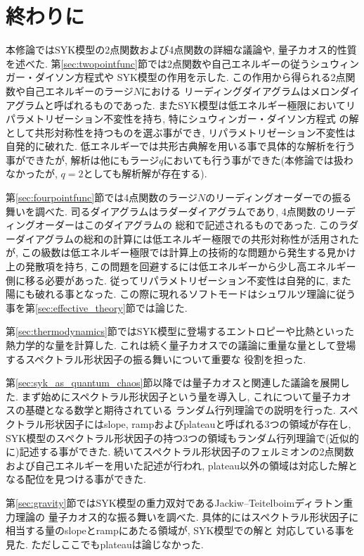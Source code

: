 \section{終わりに\label{sec:conclusion}}
本修論ではSYK模型の2点関数および4点関数の詳細な議論や, 量子カオス的性質を述べた. 
第\ref{sec:twopointfunc}節では2点関数や自己エネルギーの従うシュウィンガー・ダイソン方程式や
SYK模型の作用を示した. 
この作用から得られる2点関数や自己エネルギーのラージ$N$における
リーディングダイアグラムはメロンダイアグラムと呼ばれるものであった. 
またSYK模型は低エネルギー極限においてリパラメトリゼーション不変性を持ち, 特にシュウィンガー・ダイソン方程式
の解として共形対称性を持つものを選ぶ事ができ, リパラメトリゼーション不変性は自発的に破れた. 
低エネルギーでは共形古典解を用いる事で具体的な解析を行う事ができたが, 
解析は他にもラージ$q$においても行う事ができた(本修論では扱わなかったが, $q=2$としても解析解が存在する). 

第\ref{sec:fourpointfunc}節では4点関数のラージ$N$のリーディングオーダーでの振る舞いを調べた. 
司るダイアグラムはラダーダイアグラムであり, 4点関数のリーディングオーダーはこのダイアグラムの
総和で記述されるものであった. 
このラダーダイアグラムの総和の計算には低エネルギー極限での共形対称性が活用されたが, 
この級数は低エネルギー極限では計算上の技術的な問題から発生する見かけ上の発散項を持ち, 
この問題を回避するには低エネルギーから少し高エネルギー側に移る必要があった. 
従ってリパラメトリゼーション不変性は自発的に, また陽にも破れる事となった. 
この際に現れるソフトモードはシュワルツ理論に従う事を第\ref{sec:effective_theory}節では論じた. 

第\ref{sec:thermodynamics}節ではSYK模型に登場するエントロピーや比熱といった熱力学的な量を計算した. 
これは続く量子カオスでの議論に重量な量として登場するスペクトラル形状因子の振る舞いについて重要な
役割を担った. 

第\ref{sec:syk_as_quantum_chaos}節以降では量子カオスと関連した議論を展開した. 
まず始めにスペクトラル形状因子という量を導入し, これについて量子カオスの基礎となる数学と期待されている
ランダム行列理論での説明を行った. 
スペクトラル形状因子にはslope, rampおよびplateauと呼ばれる3つの領域が存在し, 
SYK模型のスペクトラル形状因子の持つ3つの領域もランダム行列理論で(近似的に)記述する事ができた. 
続いてスペクトラル形状因子のフェルミオンの2点関数および自己エネルギーを用いた記述が行われ, 
plateau以外の領域は対応した解となる配位を見つける事ができた. 

第\ref{sec:gravity}節ではSYK模型の重力双対であるJackiw--Teitelboimディラトン重力理論の
量子カオス的な振る舞いを調べた. 
具体的にはスペクトラル形状因子に相当する量のslopeとrampにあたる領域が, SYK模型での解と
対応している事を見た. 
ただしここでもplateauは論じなかった. 

